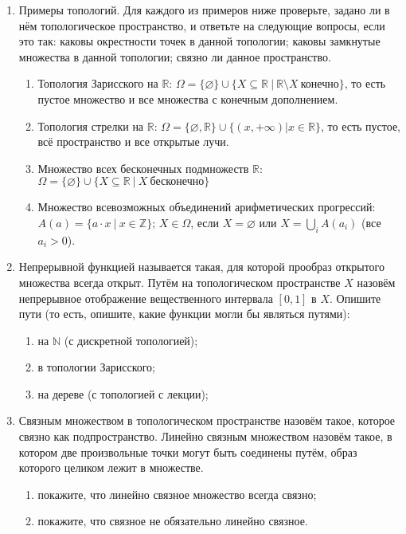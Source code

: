 \documentclass[10pt,a4paper,oneside]{article}
\begin{document}
\begin{enumerate}
\item Примеры топологий.
Для каждого из примеров ниже проверьте, задано ли в нём топологическое пространство, и ответьте на следующие вопросы, если это так:
каковы окрестности точек в данной топологии;
каковы замкнутые множества в данной топологии;
связно ли данное пространство.

\begin{enumerate}
\item Топология Зарисского на $\mathbb{R}$: 
$\Omega = \{\varnothing\} \cup \{ X \subseteq \mathbb{R}\ |\ \mathbb{R} \setminus X\ \text{конечно} \}$,
то есть пустое множество и все множества с конечным дополнением.
\item Топология стрелки на $\mathbb{R}$:
$\Omega = \{\varnothing, \mathbb{R}\} \cup \{ (x,+\infty) | x \in \mathbb{R} \}$, то есть пустое, 
всё пространство и все открытые лучи.
\item Множество всех бесконечных подмножеств $\mathbb{R}$:
$\Omega = \{\varnothing\} \cup \{ X \subseteq \mathbb{R}\ |\ X\ \text{бесконечно} \}$
\item Множество всевозможных объединений арифметических прогрессий:
$A(a) = \{ a\cdot x\ |\ x \in \mathbb{Z}\}$;
$X \in \Omega$, если $X=\varnothing$ или $X = \bigcup_i A(a_i)$ (все $a_i > 0$).
\end{enumerate}

\item Непрерывной функцией называется такая, для которой прообраз открытого множества всегда открыт.
Путём на топологическом пространстве $X$ назовём непрерывное отображение вещественного интервала $[0,1]$ в $X$.
Опишите пути (то есть, опишите, какие функции могли бы являться путями):
\begin{enumerate}
\item на $\mathbb{N}$ (с дискретной топологией);
\item в топологии Зарисского;
\item на дереве (с топологией с лекции);
\end{enumerate}

\item Связным множеством в топологическом пространстве назовём такое, которое связно как подпространство.
Линейно связным множеством назовём такое, в котором две произвольные точки могут быть соединены путём,
образ которого целиком лежит в множестве. 
\begin{enumerate}
\item покажите, что линейно связное множество всегда связно;
\item покажите, что связное не обязательно линейно связное.
\end{enumerate}


\end{enumerate}
\end{document}
